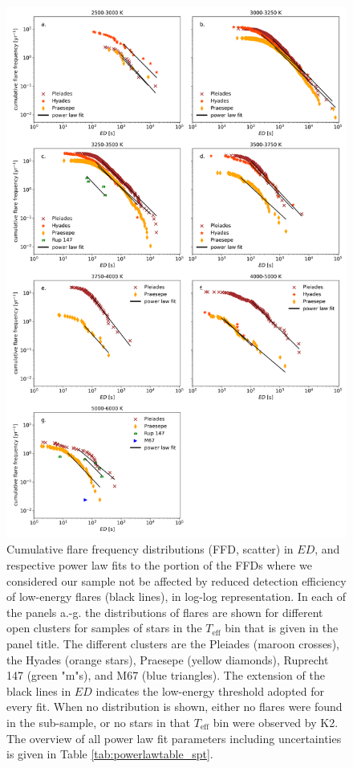 \documentclass{aa}
\begin{document}
\begin{figure}[Ht!]
    \centering
    \includegraphics[width=14cm]{pics/FFDs/SpT_wise_sample_ffd_ED_wheatland.png}
    \caption{Cumulative flare frequency distributions (FFD, scatter) in $ED$, and respective power law fits to the portion of the FFDs where we considered our sample not be affected by reduced detection efficiency of low-energy flares (black lines), in log-log representation. In each of the panels a.-g. the distributions of flares are shown for different open clusters for samples of stars in the $T_\mathrm{eff}$ bin that is given in the panel title. The different clusters are the Pleiades (maroon crosses), the Hyades (orange stars), Praesepe (yellow diamonds), Ruprecht 147 (green "m"s), and M67 (blue triangles). The extension of the black lines in $ED$ indicates the low-energy threshold adopted for every fit. When no distribution is shown, either no flares were found in the sub-sample, or no stars in that $T_\mathrm{eff}$ bin were observed by K2. The overview of all power law fit parameters including uncertainties is given in Table \ref{tab:powerlawtable_spt}.}       	
    \label{fig:powerlawfits_s}
\end{figure}
\end{document}
